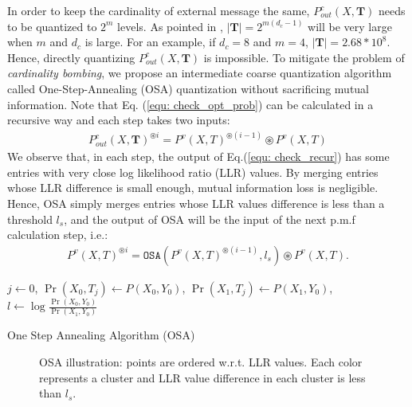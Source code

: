 \documentclass [PhD] {uclathes}
\begin{document}
In order to keep the cardinality of external message the same, $P^c_{out}(X,\mathbf{T})$ needs to be quantized to $2^m$ levels. As pointed in \cite{Lewandowsky2018-IBRegular}, $|\mathbf{T}|=2^{m(d_c-1)}$ will be very large when $m$ and $d_c$ is large. For an example, if $d_c=8$ and $m=4$, $|\mathbf{T}|=2.68*10^8$. Hence, directly quantizing $P^c_{out}(X,\mathbf{T})$ is impossible. To mitigate the problem of \textit{cardinality bombing}, we propose an intermediate coarse quantization algorithm called One-Step-Annealing (OSA) quantization without sacrificing mutual information. Note that Eq. (\ref{equ: check_opt_prob}) can be calculated in a recursive way and each step takes two inputs:
\begin{align}
\label{equ: check_recur}
    P_{out}^{c}(X,\mathbf{T})^{\circledast i}=P^v(X,T)^{\circledast (i-1)}\circledast P^v(X,T) 
\end{align}
We observe that, in each step, the output of Eq.(\ref{equ: check_recur}) has some entries with very close log likelihood ratio (LLR) values. By merging entries whose LLR difference is small enough, mutual information loss is negligible.  Hence, OSA simply merges entries whose LLR values difference is less than a threshold $l_s$, and the output of OSA will be the input of the next p.m.f calculation step, i.e.:
\begin{align}
\label{equ: check_osa}
    P^{v}(X,T)^{\circledast i}= \texttt{OSA}(P^v(X,T)^{\circledast (i-1)},l_s)\circledast P^v(X,T).
\end{align}
\begin{algorithm}[t]
    \label{alg: OSA}
    
    $j\leftarrow0$, 
    $\Pr(X_0,T_j)\leftarrow P(X_0,Y_0)$,
    $\Pr(X_1,T_j)\leftarrow P(X_1,Y_0)$, 
    $l\leftarrow  \log\frac{\Pr(X_0,Y_0)}{\Pr(X_1,Y_0)}$
    
    \caption{One Step Annealing Algorithm (OSA) }\label{sec: MIMDDE}
\end{algorithm}
\begin{figure}
	\centering
	
	\caption{OSA illustration: points are ordered w.r.t. LLR values. Each color represents a cluster and LLR value difference in each cluster is less than $l_s$. }
	\label{fig: OSA}
\end{figure}
\end{document}

